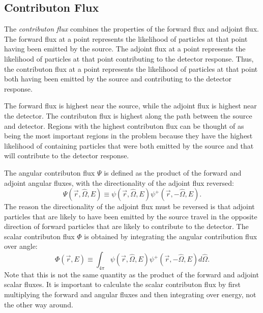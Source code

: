\subsection{Contributon Flux}
\label{sec:bg:rt:contrib}

The \textit{contributon flux} combines the properties of the forward flux and adjoint flux.
The forward flux at a point represents the likelihood of particles at that point having been emitted by the source.
The adjoint flux at a point represents the likelihood of particles at that point contributing to the detector response.
Thus, the contributon flux at a point represents the likelihood of particles at that point both having been emitted by the source and contributing to the detector response.

The forward flux is highest near the source, while the adjoint flux is highest near the detector.
The contributon flux is highest along the path between the source and detector.
Regions with the highest contributon flux can be thought of as being the most important regions in the problem because they have the highest likelihood of containing particles that were both emitted by the source and that will contribute to the detector response.

The angular contributon flux $\Psi$ is defined as the product of the forward and adjoint angular fluxes, with the directionality of the adjoint flux reversed:
\begin{equation}\label{eq:bg:rt:angular-contributon}
  \Psi\left(\vec{r},\hat{\Omega},E\right) \equiv
  \psi\left(\vec{r},\hat{\Omega},E\right)\psi^+\left(\vec{r},-\hat{\Omega},E\right).
\end{equation}
The reason the directionality of the adjoint flux must be reversed is that adjoint particles that are likely to have been emitted by the source travel in the opposite direction of forward particles that are likely to contribute to the detector.
The scalar contributon flux $\Phi$ is obtained by integrating the angular contribution flux over angle:
\begin{equation}\label{eq:bg:rt:scalar-contributon}
  \Phi\left(\vec{r},E\right) \equiv
  \int_{4\pi}\psi\left(\vec{r},\hat{\Omega},E\right)\psi^+\left(\vec{r},-\hat{\Omega},E\right)d\hat{\Omega}.
\end{equation}
Note that this is not the same quantity as the product of the forward and adjoint scalar fluxes.
It is important to calculate the scalar contributon flux by first multiplying the forward and angular fluxes and then integrating over energy, not the other way around.


